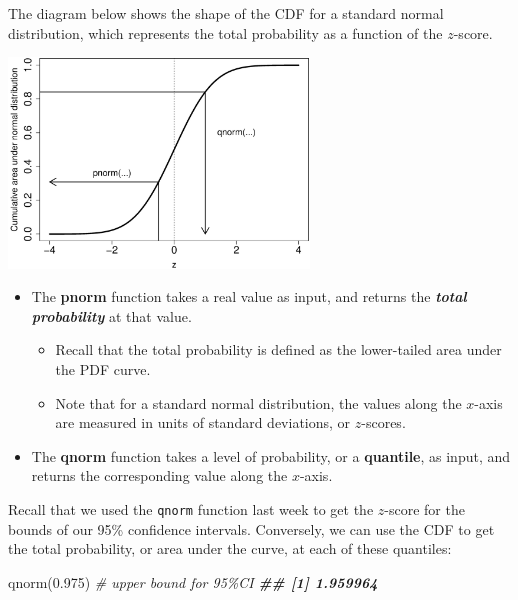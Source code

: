 \documentclass[
]{article}
\newenvironment{Shaded}{\begin{snugshade}}{\end{snugshade}}
\newcommand{\CommentTok}[1]{\textcolor[rgb]{0.56,0.35,0.01}{\textit{#1}}}
\newcommand{\DocumentationTok}[1]{\textcolor[rgb]{0.56,0.35,0.01}{\textbf{\textit{#1}}}}
\newcommand{\FloatTok}[1]{\textcolor[rgb]{0.00,0.00,0.81}{#1}}
\newcommand{\FunctionTok}[1]{\textcolor[rgb]{0.00,0.00,0.00}{#1}}
\newcommand{\NormalTok}[1]{#1}
\providecommand{\tightlist}{%
  \setlength{\itemsep}{0pt}\setlength{\parskip}{0pt}}
\begin{document}
The diagram below shows the shape of the CDF for a standard normal
distribution, which represents the total probability as a function of
the \(z\)-score.

\includegraphics[width=0.6\textwidth,height=\textheight]{Images/pnorm-and-qnorm.png}

\begin{itemize}
\tightlist
\item
  The \textbf{pnorm} function takes a real value as input, and returns
  the \textbf{\emph{total probability}} at that value.

  \begin{itemize}
  \tightlist
  \item
    Recall that the total probability is defined as the lower-tailed
    area under the PDF curve.
  \item
    Note that for a standard normal distribution, the values along the
    \(x\)-axis are measured in units of standard deviations, or
    \(z\)-scores.
  \end{itemize}
\item
  The \textbf{qnorm} function takes a level of probability, or a
  \textbf{quantile}, as input, and returns the corresponding value along
  the \(x\)-axis.
\end{itemize}

Recall that we used the \texttt{qnorm} function last week to get the
\(z\)-score for the bounds of our 95\% confidence intervals. Conversely,
we can use the CDF to get the total probability, or area under the
curve, at each of these quantiles:

\begin{Shaded}
\begin{Highlighting}[]
\FunctionTok{qnorm}\NormalTok{(}\FloatTok{0.975}\NormalTok{) }\CommentTok{\# upper bound for 95\%CI}
\DocumentationTok{\#\# [1] 1.959964}
\end{Highlighting}
\end{Shaded}
\end{document}
